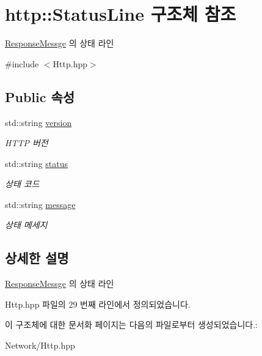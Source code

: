 \hypertarget{structhttp_1_1_status_line}{}\section{http\+:\+:Status\+Line 구조체 참조}
\label{structhttp_1_1_status_line}


\hyperlink{classhttp_1_1_response_messge}{Response\+Messge} 의 상태 라인  




{\ttfamily \#include $<$Http.\+hpp$>$}

\subsection*{Public 속성}
\begin{DoxyCompactItemize}
\item 
\mbox{\label{structhttp_1_1_status_line_af3500800ad3ac685b19763d5e60b6353}} 
std\+::string \hyperlink{structhttp_1_1_status_line_af3500800ad3ac685b19763d5e60b6353}{version}
\begin{DoxyCompactList}\small\item\em H\+T\+TP 버전 \end{DoxyCompactList}\item 
\mbox{\label{structhttp_1_1_status_line_acfd9752d4b62330a390f17f5d011fcd2}} 
std\+::string \hyperlink{structhttp_1_1_status_line_acfd9752d4b62330a390f17f5d011fcd2}{status}
\begin{DoxyCompactList}\small\item\em 상태 코드 \end{DoxyCompactList}\item 
\mbox{\label{structhttp_1_1_status_line_a9f49c5c1cc247c2a85ed717870bfc844}} 
std\+::string \hyperlink{structhttp_1_1_status_line_a9f49c5c1cc247c2a85ed717870bfc844}{message}
\begin{DoxyCompactList}\small\item\em 상태 메세지 \end{DoxyCompactList}\end{DoxyCompactItemize}


\subsection{상세한 설명}
\hyperlink{classhttp_1_1_response_messge}{Response\+Messge} 의 상태 라인 

Http.\+hpp 파일의 29 번째 라인에서 정의되었습니다.



이 구조체에 대한 문서화 페이지는 다음의 파일로부터 생성되었습니다.\+:\begin{DoxyCompactItemize}
\item 
Network/Http.\+hpp\end{DoxyCompactItemize}

